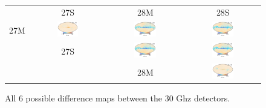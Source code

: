 \documentclass{aa}
\begin{document}
\begin{figure}
\begin{tabular}{B C C C}
& 27S & 28M & 28S\\
  
  27M & \includegraphics[width=0.31\textwidth]{figs/27M_minus_27S_depol.pdf} & 
\includegraphics[width=0.31\textwidth]{figs/27M_minus_28M_depol.pdf} &
\includegraphics[width=0.31\textwidth]{figs/27M_minus_28S_depol.pdf}\\
 & \hspace{4.8cm } 27S & \includegraphics[width=0.31\textwidth]{figs/27S_minus_28M_depol.pdf} &
 \includegraphics[width=0.31\textwidth]{figs/27S_minus_28S_depol.pdf}\\
 &     \caption{All 6 possible difference maps between the 30 Ghz detectors. } & \hspace{4.7cm } 28M  & \includegraphics[width=0.31\textwidth]{figs/28M_minus_28S_depol.pdf} \\
  \end{tabular}
\vspace{-0.75cm}
      \label{fig:bp_diffs}
\end{figure}
\end{document}
